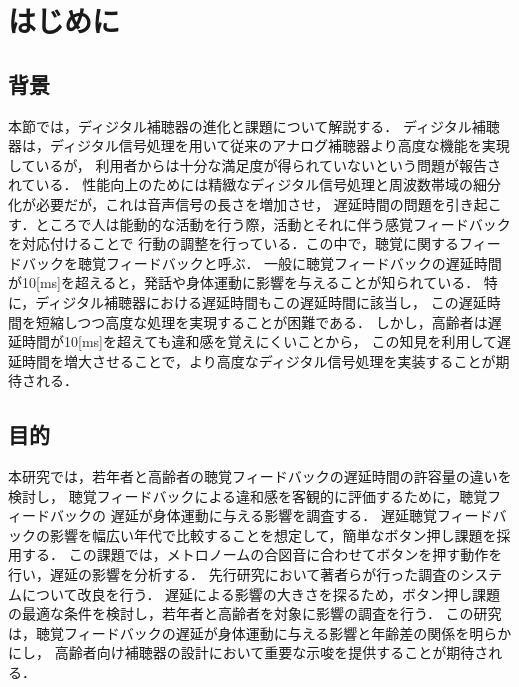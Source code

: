 \section{はじめに}
\subsection{背景}
本節では，ディジタル補聴器の進化と課題について解説する．
ディジタル補聴器は，ディジタル信号処理を用いて従来のアナログ補聴器より高度な機能を実現しているが，
利用者からは十分な満足度が得られていないという問題が報告されている\cite{cf:Manzokudo}．
性能向上のためには精緻なディジタル信号処理と周波数帯域の細分化が必要だが，これは音声信号の長さを増加させ，
遅延時間の問題を引き起こす．ところで人は能動的な活動を行う際，活動とそれに伴う感覚フィードバックを対応付けることで
行動の調整を行っている．この中で，聴覚に関するフィードバックを聴覚フィードバックと呼ぶ\cite{cf:DAF}．
一般に聴覚フィードバックの遅延時間が10[ms]を超えると，発話や身体運動に影響を与えることが知られている\cite{cf:DelayTime-ninnchi}．
特に，ディジタル補聴器における遅延時間もこの遅延時間に該当し，
この遅延時間を短縮しつつ高度な処理を実現することが困難である．
しかし，高齢者は遅延時間が10[ms]を超えても違和感を覚えにくいことから，
この知見を利用して遅延時間を増大させることで，より高度なディジタル信号処理を実装することが期待される．
\subsection{目的}
本研究では，若年者と高齢者の聴覚フィードバックの遅延時間の許容量の違いを検討し，
聴覚フィードバックによる違和感を客観的に評価するために，聴覚フィードバックの
遅延が身体運動に与える影響を調査する．
遅延聴覚フィードバックの影響を幅広い年代で比較することを想定して，簡単なボタン押し課題を採用する．
この課題では，メトロノームの合図音に合わせてボタンを押す動作を行い，遅延の影響を分析する．
先行研究\cite{cf:shigematu}において著者らが行った調査のシステムについて改良を行う．
遅延による影響の大きさを探るため，ボタン押し課題の最適な条件を検討し，若年者と高齢者を対象に影響の調査を行う．
この研究は，聴覚フィードバックの遅延が身体運動に与える影響と年齢差の関係を明らかにし，
高齢者向け補聴器の設計において重要な示唆を提供することが期待される．
